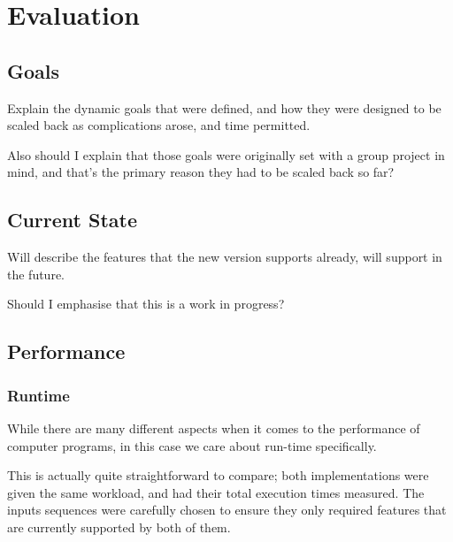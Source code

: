 \chapter{Evaluation}\label{ch:eval}

\section{Goals}
Explain the dynamic goals that were defined, and how they were designed to be scaled back as complications arose, and time permitted. 

Also should I explain that those goals were originally set with a group project in mind, and that's the primary reason they had to be scaled back so far?

\section{Current State}
Will describe the features that the new version supports already, will support in the future.

Should I emphasise that this is a work in progress?

\section{Performance}

\subsection{Runtime}
While there are many different aspects when it comes to the performance of computer programs, in this case we care about run-time specifically. 

This is actually quite straightforward to compare; both implementations were given the same workload, and had their total execution times measured. The inputs sequences were carefully chosen to ensure they only required features that are currently supported by both of them.

